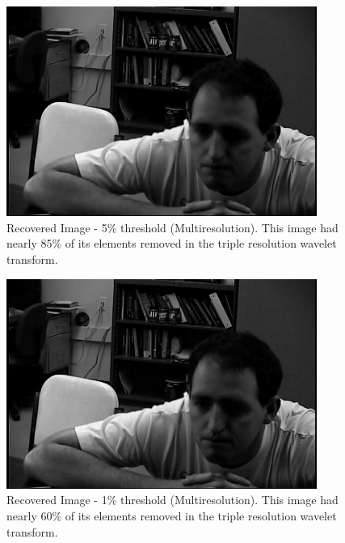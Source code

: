 \begin{figure}[htb]
\begin{center}
\includegraphics [width=4in]{recover3R005T.jpg}
\end{center}
\caption{Recovered Image - 5\% threshold (Multiresolution). This image had nearly 85\% of its elements removed in the triple resolution wavelet transform.    }
\label{recover3R005}
\end{figure}


\begin{figure}[htb]
\begin{center}
\includegraphics [width=4in]{recover3R001.jpg}
\end{center}
\caption{Recovered Image - 1\% threshold (Multiresolution).  This image had nearly 60\% of its elements removed in the triple resolution wavelet transform.   }
\label{recover3R001}
\end{figure}

